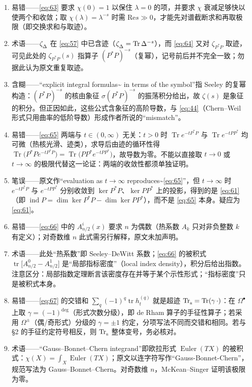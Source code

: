 \documentclass[11pt]{amsart}
\theoremstyle{definition}
\theoremstyle{remark}
\theoremstyle{plain}
\numberwithin{equation}{section}
\renewcommand{\:}{\colon}
\DeclareMathOperator{\Trs}{Tr\mstrut _s}
\DeclareMathOperator{\Tr}{Tr}
\DeclareMathOperator{\tr}{tr}
\DeclareMathOperator{\ind}{ind}
\DeclareRobustCommand{\mstrut}{^{\vphantom{1*\prime y\vee M}}}
\DeclareMathOperator{\Euler}{Euler}
\newcommand{\q}{^{(q)}}
\newcommand{\zD}{\zeta \mstrut _\Delta }
\renewcommand{\Re}{\text{Re}}
\begin{document}
\begin{enumerate}[leftmargin=2.2em,itemsep=2pt,topsep=2pt]
  \item 易错——\eqref{eq:63} 要求 $\chi(0)=1$ 以保住 $\lambda=0$ 的项，并要求 $\chi$ 衰减足够快以使两个和收敛；取 $\chi(\lambda)=\lambda^{-s}$ 时需 $\Re s\gg0$，才能先对谱截断求和再取极限（即交换求和与取迹）。
  \item 术语——$\zD$ 在 \eqref{eq:57} 中已含迹（$\zD=\Tr\Delta^{-s}$），而 \eqref{eq:64} 又对 $\zeta_{P^*P}$ 取迹，可见此处的 $\zeta_{P^*P}(s)$ 指算子 $(P^*P)^{-s}$（复幂），记号前后并不完全一致；勿据此认为原文重复取迹。
  \item 含糊——“explicit integral formulas\textasciitilde{}\cite{Se4} in terms of the symbol”指 Seeley 的复幂构造：$(P^*P)^{-s}$ 的核由象征 $\sigma(P^*P)^{-s}$ 的振荡积分给出，故 $\zeta(s)$ 是象征的积分。但正因如此，这些公式含象征的高阶导数，与 \eqref{eq:44}（Chern–Weil 形式只用曲率的低阶导数）形成作者所说的“mismatch”。
  \item 易错——\eqref{eq:65} 两端与 $t\in(0,\infty)$ 无关：$t>0$ 时 $\Tr e^{-tP^*P}$ 与 $\Tr e^{-tPP^*}$ 均可微（热核光滑、迹类），求导后由迹的循环性得 $\Tr\bigl(P^*P e^{-tP^*P}\bigr)=\Tr\bigl(PP^*e^{-tPP^*}\bigr)$，故导数为零。不能以直接取 $t\to0$ 或 $t\to\infty$ 的极限代替这一论证：两端的收敛性都须单独证明。
  \item 笔误——原文作“evaluation as $t\to\infty$ reproduces\textasciitilde{}\eqref{eq:65}”，但 $t\to\infty$ 时 $e^{-tP^*P}$ 与 $e^{-tPP^*}$ 分别收敛到 $\ker P^*P$、$\ker PP^*$ 上的投影，得到的是 \eqref{eq:61}（即 $\ind P=\dim\ker P^*P-\dim\ker PP^*$），而不是 \eqref{eq:65} 本身。疑应为 \eqref{eq:61}。
  \item 易错——\eqref{eq:66} 中的 $A^i_{n/2}(x)$ 要求 $n$ 为偶数（热系数 $A_k$ 只对非负整数 $k$ 有定义）；对奇数维 $n$ 此式需另行解释，原文未加声明。
  \item 术语——此处“热系数”即 Seeley–DeWitt 系数；\eqref{eq:66} 的被积式 $\tr\bigl[A^0_{n/2}-A^1_{n/2}\bigr]$ 是“局部指标密度”（local index density），积分后给出指数。注意区分：局部指数定理断言该密度存在并等于某个示性形式；“指标密度”只是被积式本身。
  \item 易错——\eqref{eq:67} 的交错和 $\sum_q(-1)^q\tr h_t\q$ 就是超迹 $\Trs=\Tr(\gamma\,\cdot)$：在 $\Omega^{\bullet}$ 上取 $\gamma=(-1)^{\deg}$（形式次数分级），即 de Rham 算子的手征性算子；若采用 $\Omega^{\pm}$（偶/奇形式）分级的 $\gamma=\pm1$ 约定，分项写法不同而交错和相同。若与 §2 的手征约定符号相反，则 $\Trs$ 整体变号，务必核对。
  \item 术语——“Gauss–Bonnet–Chern integrand”即欧拉形式 $\Euler(TX)$ 的被积式：$\chi(X)=\int_X \Euler(TX)$；原文以连字符写作“Gauss-Bonnet-Chern”，规范写法为 Gauss–Bonnet–Chern。对奇数维 $n$，McKean–Singer 证明该极限为零。

\end{enumerate}
\end{document}
